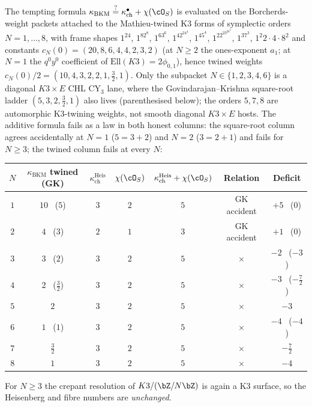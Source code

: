 \label{sec:k3e-orbifold-landscape}%
\begin{remark}
\label{rem:bkm-decomposition-adversarial}
The tempting formula \(\kappa_{\mathrm{BKM}}\stackrel{?}{=}\kappa_{\mathrm{ch}}^\bullet+\chi(\cO_S)\) is evaluated on the Borcherds-weight packets attached to the Mathieu-twined K3 forms of symplectic orders \(N=1,\ldots,8\), with frame shapes $1^{24}$, $1^82^8$, $1^63^6$, $1^42^24^4$, $1^45^4$, $1^22^23^26^2$, $1^37^3$, $1^2 2\cdot4\cdot 8^2$ and constants $c_N(0) = (20, 8, 6, 4, 4, 2, 3, 2)$ (at $N \geq 2$ the ones-exponent $a_1$; at $N = 1$ the $q^0y^0$ coefficient of $\mathrm{Ell}(K3) = 2\phi_{0,1}$), hence twined weights $c_N(0)/2 = (10, 4, 3, 2, 2, 1, \tfrac32, 1)$. Only the subpacket \(N\in\{1,2,3,4,6\}\) is a diagonal \(K3\times E\) CHL CY\(_3\) lane, where the Govindarajan--Krishna square-root ladder $(5, 3, 2, \tfrac32, 1)$ also lives (parenthesised below); the orders \(5,7,8\) are automorphic K3-twining weights, not smooth diagonal \(K3\times E\) hosts. The additive formula fails as a law in both honest columns: the square-root column agrees accidentally at \(N=1\) ($5 = 3+2$) and \(N=2\) ($3 = 2+1$) and fails for \(N \geq 3\); the twined column fails at every \(N\):
\begin{center}
\renewcommand{\arraystretch}{1.3}
\begin{tabular}{ccccccc}
$N$ & $\kappa_{\mathrm{BKM}}$ twined (GK) & $\kappa_{\mathrm{ch}}^{\mathrm{Heis}}$ & $\chi(\cO_S)$ & $\kappa_{\mathrm{ch}}^{\mathrm{Heis}} + \chi(\cO_S)$ & Relation & Deficit \\
\hline
$1$ & $10$ \ ($5$) & $3$ & $2$ & $5$ & GK accident & $+5$ \ ($0$) \\
$2$ & $4$ \ ($3$) & $2$ & $1$ & $3$ & GK accident & $+1$ \ ($0$) \\
$3$ & $3$ \ ($2$) & $3$ & $2$ & $5$ & $\times$ & $-2$ \ ($-3$) \\
$4$ & $2$ \ ($\tfrac32$) & $3$ & $2$ & $5$ & $\times$ & $-3$ \ ($-\tfrac72$) \\
$5$ & $2$ & $3$ & $2$ & $5$ & $\times$ & $-3$ \\
$6$ & $1$ \ ($1$) & $3$ & $2$ & $5$ & $\times$ & $-4$ \ ($-4$) \\
$7$ & $\tfrac32$ & $3$ & $2$ & $5$ & $\times$ & $-\tfrac72$ \\
$8$ & $1$ & $3$ & $2$ & $5$ & $\times$ & $-4$
\end{tabular}
\end{center}
For $N \ge 3$ the crepant resolution of $K3/(\bZ/N\bZ)$ is again a K3 surface, so the Heisenberg and fibre numbers are \emph{unchanged}.

\end{remark}

